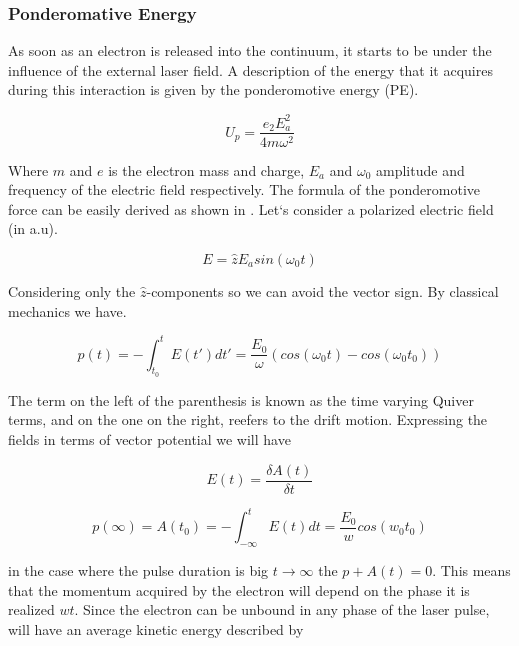 \subsubsection{Ponderomative Energy}


As soon as an electron is released into the continuum, it starts to be under the influence of the external laser field. A description of the energy that it acquires during this interaction is given by the ponderomotive energy (PE).

\begin{equation}
U_{p} = \dfrac{e_{2}E_{a}^{2}}{4m \omega^{2}}
\end{equation}

Where $m$ and $e$ is the electron mass and charge, $E_{a}$ and $\omega_{0}$  amplitude and frequency of the electric field respectively. The formula of the ponderomotive force can be easily derived as shown in \cite{protopapas_atomic_1997}\cite{connerade_highly_1998}. Let`s consider a polarized electric field (in a.u).

\begin{equation}
E=\widehat{z}E_{a}sin(\omega_{0} t) 
\end{equation}

Considering only the $\widehat{z}$-components so we can avoid the vector sign. By classical mechanics we have.

\begin{equation}
p(t)=-\int_{t_{0}}^{t} E(t\prime)dt\prime = \dfrac{E_{0}}{\omega} (cos(\omega_{0} t)- cos(\omega_{0} t_{0}))
\end{equation}

The term on the left of the parenthesis is known as the time varying Quiver terms, and on the one on the right, reefers to the drift motion. 
Expressing the fields in terms of vector potential we will have

\begin{equation}
E(t) = \dfrac{\delta A(t)}{\delta t}
\end{equation}

\begin{equation}
p(\infty) = A(t_{0}) = -\int_{-\infty}^{t} E(t) dt = \dfrac{E_{0}}{w} cos(w_{0}t_{0})
\label{eq:pmax}
\end{equation}

in the case where the pulse  duration is big $t \longrightarrow \infty$ the $p + A(t) = 0$. This means that the momentum acquired by the electron will depend on the phase it is realized $wt$. Since the electron can be unbound in any phase of the laser pulse, will have an average kinetic energy described by

